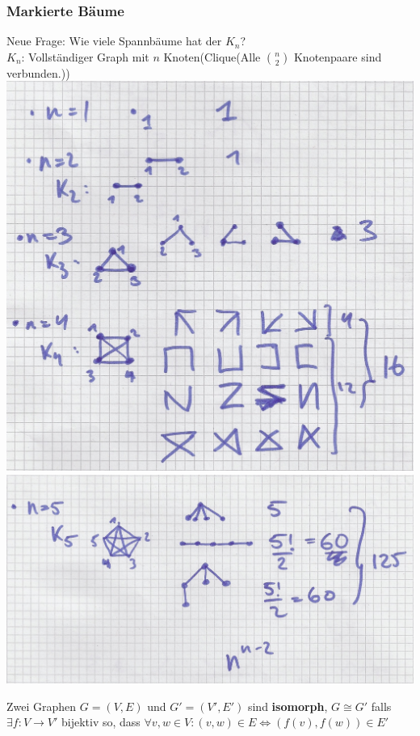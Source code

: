 \subsubsection{Markierte Bäume}
Neue Frage: Wie viele Spannbäume hat der $K_n$?\\
$K_n$: Vollständiger Graph mit $n$ Knoten(Clique(Alle $\binom{n}{2}$ Knotenpaare sind verbunden.))\\
\includegraphics[width=\textwidth]{Bild37} \\
\includegraphics[width=\textwidth]{Bild38}
\begin{def*}[note = isomorph , index = isomorph]
	Zwei Graphen $G=(V,E)$ und $G'=(V',E')$ sind \textbf{isomorph}, $G \cong G'$ falls $\exists f: V \rightarrow V'$ bijektiv so, dass $\forall v,w \in V : (v,w) \in E \iff (f(v),f(w)) \in E'$
\end{def*}
